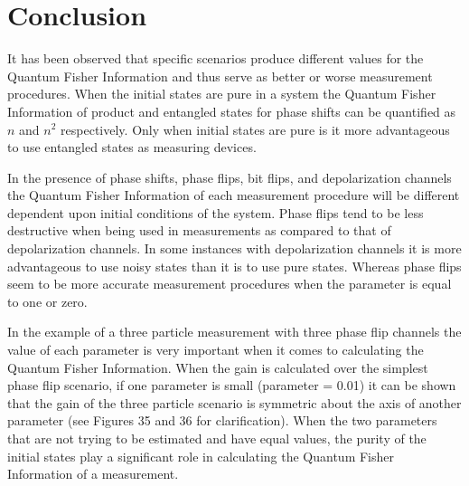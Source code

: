 \documentclass[twocolumn]{article}
\begin{document}
\section*{Conclusion}
It has been observed that specific scenarios produce different values for the Quantum Fisher Information and thus serve as better or worse measurement procedures. When the initial states are pure in a system the Quantum Fisher Information of product and entangled states for phase shifts can be quantified as $n$ and $n^2$ respectively. Only when initial states are pure is it more advantageous to use entangled states as measuring devices.

In the presence of phase shifts, phase flips, bit flips, and depolarization channels the Quantum Fisher Information of each measurement procedure will be different dependent upon initial conditions of the system. Phase flips tend to be less destructive when being used in measurements as compared to that of depolarization channels. In some instances with depolarization channels it is more advantageous to use noisy states than it is to use pure states. Whereas phase flips seem to be more accurate measurement procedures when the parameter is equal to one or zero.

In the example of a three particle measurement with three phase flip channels the value of each parameter is very important when it comes to calculating the Quantum Fisher Information. When the gain is calculated over the simplest phase flip scenario, if one parameter is small (parameter = 0.01) it can be shown that the gain of the three particle scenario is symmetric about the axis of another parameter (see Figures 35 and 36 for clarification). When the two parameters that are not trying to be estimated and have equal values, the purity of the initial states play a significant role in calculating the Quantum Fisher Information of a measurement.
\end{document}
